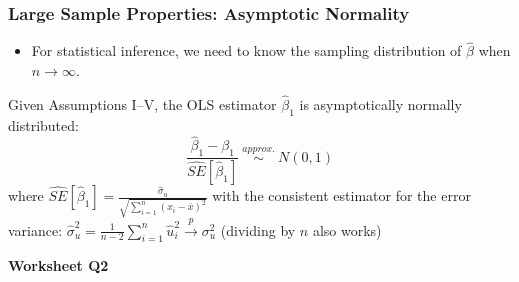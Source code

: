 \documentclass[xcolor=svgnames,9pt,english,aspectratio=169,t]{beamer}
\begin{document}



\begin{frame}[t]
\frametitle{Large Sample Properties: Asymptotic Normality}
\small
\begin{itemize}
\item For statistical inference, we need to know the sampling distribution
of $\hat\beta$ when $n\to\infty$.
\end{itemize}
\begin{theorem}
Given \alert{Assumptions I--V}, the OLS estimator $\widehat{\beta}_1$ is asymptotically normally distributed:
$$
\frac{\hat{\beta}_1 - \beta_1}{\widehat{SE}[\hat{\beta}_1]} \ \stackrel{approx.}{\sim} \ N(0,1)$$
where
$\widehat{SE}[\hat\beta_1] = \frac{\hat{\sigma}_{u}}{\sqrt{\sum_{i=1}^n (x_i - \bar{x})^2}}$ with the consistent estimator for the error variance:
$\hat{\sigma}^2_{u}=\frac{1}{n-2}\sum_{i=1}^n \hat{u}_i^2 \stackrel{p}{\rightarrow} \sigma^2_u$ (dividing by $n$ also works)
\end{theorem}

\bigskip\textbf{Worksheet Q2}
\end{frame}
\end{document}
